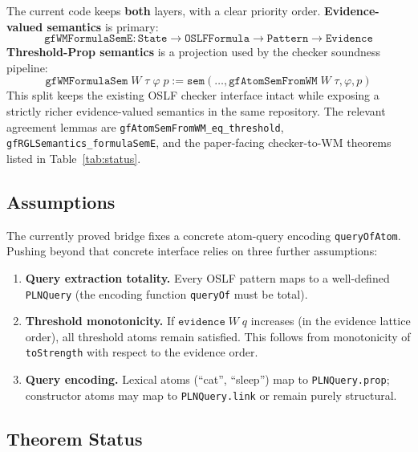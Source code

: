 \documentclass[11pt]{article}
\newcommand{\code}[1]{\texttt{#1}}
\newcommand{\OSLF}{\textup{OSLF}}
\begin{document}
The current code keeps \textbf{both} layers, with a clear priority order.
\textbf{Evidence-valued semantics} is primary:
\[
  \texttt{gfWMFormulaSemE} : \texttt{State} \to \texttt{OSLFFormula} \to
    \texttt{Pattern} \to \texttt{Evidence}
\]
\textbf{Threshold-Prop semantics} is a projection used by the checker soundness
pipeline:
\[
  \texttt{gfWMFormulaSem}\; W\; \tau\; \varphi\; p
  := \texttt{sem}(\ldots,\texttt{gfAtomSemFromWM}\; W\; \tau,\varphi,p)
\]
This split keeps the existing \OSLF{} checker interface intact while exposing a
strictly richer evidence-valued semantics in the same repository.  The relevant
agreement lemmas are \code{gfAtomSemFromWM\_eq\_threshold},
\code{gfRGLSemantics\_formulaSemE}, and the paper-facing checker-to-WM theorems
listed in Table~\ref{tab:status}.

\subsection{Assumptions}

The currently proved bridge fixes a concrete atom-query encoding
\code{queryOfAtom}.  Pushing beyond that concrete interface relies on three
further assumptions:

\begin{enumerate}
\item \textbf{Query extraction totality.}  Every \OSLF{} pattern maps to a
  well-defined \code{PLNQuery} (the encoding function
  \code{queryOf} must be total).
\item \textbf{Threshold monotonicity.}  If $\texttt{evidence}\; W\; q$
  increases (in the evidence lattice order), all threshold atoms remain
  satisfied.  This follows from monotonicity of \code{toStrength} with
  respect to the evidence order.
\item \textbf{Query encoding.}  Lexical atoms (``cat'', ``sleep'') map
  to \code{PLNQuery.prop}; constructor atoms may map to
  \code{PLNQuery.link} or remain purely structural.
\end{enumerate}

\subsection{Theorem Status}
\end{document}
